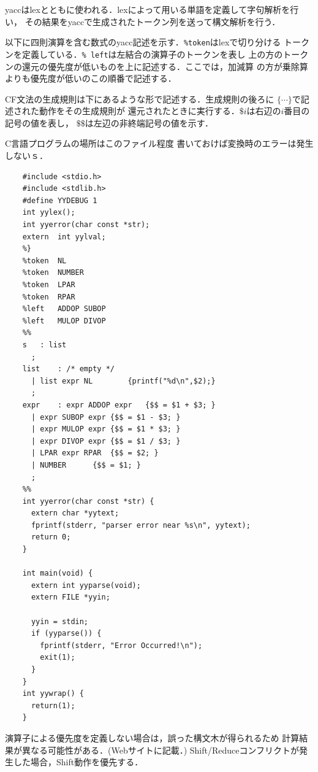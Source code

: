 \documentclass[a4j,dvipdfmx]{jbook}
\begin{document}
yaccはlexとともに使われる．lexによって用いる単語を定義して字句解析を行い，
その結果をyaccで生成されたトークン列を送って構文解析を行う．

以下に四則演算を含む数式のyacc記述を示す．\texttt{\%token}はlexで切り分ける
トークンを定義している．\texttt{\% left}は左結合の演算子のトークンを表し
上の方のトークンの還元の優先度が低いものを上に記述する．ここでは，加減算
の方が乗除算よりも優先度が低いのこの順番で記述する．

CF文法の生成規則は下にあるような形で記述する．生成規則の後ろに
$\texttt{\{}\cdots\texttt{\}}$で記述された動作をその生成規則が
還元されたときに実行する．$\texttt{\$}i$は右辺の$i$番目の記号の値を表し，
$\texttt{\$\$}$は左辺の非終端記号の値を示す．

C言語プログラムの場所はこのファイル程度
書いておけば変換時のエラーは発生しないｓ．

\begin{Verbatim}[frame=single]
  %{
    #include <stdio.h>
    #include <stdlib.h>
    #define	YYDEBUG 1
    int	yylex();
    int	yyerror(char const *str);
    extern  int yylval;
    %}
    %token	NL
    %token	NUMBER
    %token	LPAR
    %token	RPAR
    %left	ADDOP SUBOP
    %left	MULOP DIVOP
    %%
    s	: list
      ;
    list	: /* empty */
      | list expr NL		{printf("%d\n",$2);}
      ;
    expr	: expr ADDOP expr	{$$ = $1 + $3; }
      | expr SUBOP expr	{$$ = $1 - $3; }
      | expr MULOP expr	{$$ = $1 * $3; }
      | expr DIVOP expr	{$$ = $1 / $3; }
      | LPAR expr RPAR	{$$ = $2; }
      | NUMBER		{$$ = $1; }
      ;
    %%
    int yyerror(char const *str) {
      extern char *yytext;
      fprintf(stderr, "parser error near %s\n", yytext);
      return 0;
    }
    
    int main(void) {
      extern int yyparse(void);
      extern FILE *yyin;
    
      yyin = stdin;
      if (yyparse()) {
        fprintf(stderr, "Error Occurred!\n");
        exit(1);
      }
    }
    int yywrap() {
      return(1);
    }
\end{Verbatim}

演算子による優先度を定義しない場合は，誤った構文木が得られるため
計算結果が異なる可能性がある．(Webサイトに記載．)
Shift/Reduceコンフリクトが発生した場合，Shift動作を優先する．
\end{document}
